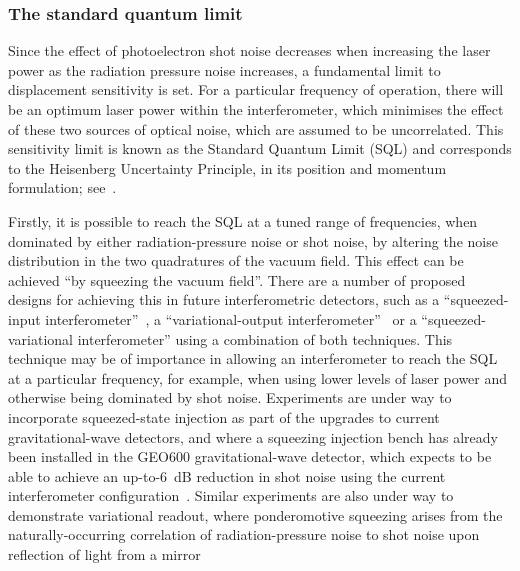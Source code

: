 \documentclass{article}
\begin{document}
\subsubsection{The standard quantum limit}
\label{subsubsection:SQL}

Since the effect of photoelectron shot noise decreases when increasing the laser
power as the radiation pressure noise increases, a fundamental limit to
displacement sensitivity is set. For a particular frequency of operation, there
will be an optimum laser power within the interferometer, which minimises the
effect of these two sources of optical noise, which are assumed to be
uncorrelated. This sensitivity limit is known as the Standard Quantum Limit
(SQL) and corresponds to the Heisenberg Uncertainty Principle, in its position
and momentum formulation; see~\cite{Edelstein, Caves1, Caves2, Loudon:1981}.

Firstly, it is possible to reach the SQL at a tuned range of frequencies, when
dominated by either radiation-pressure noise or shot noise, by altering the
noise distribution in the two quadratures of the vacuum field. This effect can
be achieved ``by squeezing the vacuum field''. There are a number of proposed
designs for achieving this in future interferometric detectors, such as a
``squeezed-input interferometer''~\cite{Caves2, Unruh:1983}, a
``variational-output interferometer''~\cite{Vyatchanin:1993} or a
``squeezed-variational interferometer'' using a combination of both techniques.
This technique may be of importance in allowing an interferometer to reach the
SQL at a particular frequency, for example, when using lower levels of laser
power and otherwise being dominated by shot noise. Experiments are under way to
incorporate squeezed-state injection as part of the upgrades to current
gravitational-wave detectors, and where a squeezing injection bench has already
been installed in the GEO600 gravitational-wave detector, which expects to be
able to achieve an up-to-6~dB reduction in shot noise using the current
interferometer configuration~\cite{Vahlbruch:2006}. Similar experiments are also
under way to demonstrate variational readout, where ponderomotive squeezing
arises from the naturally-occurring correlation of radiation-pressure noise to
shot noise upon reflection of light from a
mirror~\cite{Corbitt:2006, Sakata:2006}
\end{document}
